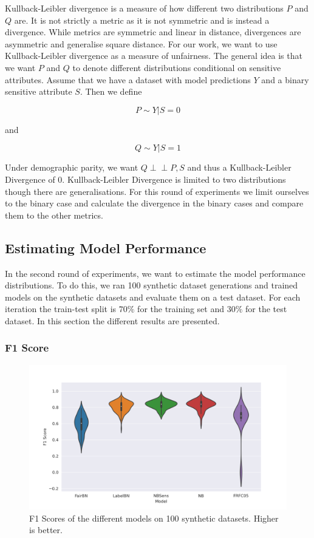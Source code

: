 Kullback-Leibler divergence is a measure of how different two distributions $P$ and $Q$ are. It is not strictly a metric as it is not symmetric and is instead a divergence. While metrics are symmetric and linear in distance, divergences are asymmetric and generalise square distance. For our work, we want to use Kullback-Leibler divergence as a measure of unfairness. The general idea is that we want $P$ and $Q$ to denote different distributions conditional on sensitive attributes. Assume that we have a dataset with model predictions $Y$ and a binary sensitive attribute $S$. Then we define 

\begin{equation*}
    P \sim Y | S = 0
\end{equation*}

and

\begin{equation*}
    Q \sim Y | S = 1
\end{equation*}

Under demographic parity, we want $Q \perp\!\!\!\perp P , S$ and thus a Kullback-Leibler Divergence of 0. Kullback-Leibler Divergence is limited to two distributions though there are generalisations. For this round of experiments we limit ourselves to the binary case and calculate the divergence in the binary cases and compare them to the other metrics.

\subsection{Estimating Model Performance}

In the second round of experiments, we want to estimate the model performance distributions. To do this, we ran 100 synthetic dataset generations and trained models on the synthetic datasets and evaluate them on a test dataset. For each iteration the train-test split is $70\%$ for the training set and $30\%$ for the test dataset. In this section the different results are presented.

\subsubsection{F1 Score}

\begin{figure}
    \centering
    \includegraphics[width=\linewidth]{figures/F1score-synthethic.png}
    \caption{F1 Scores of the different models on 100 synthetic datasets. Higher is better.}
    \label{fig:f1synth}
\end{figure}

